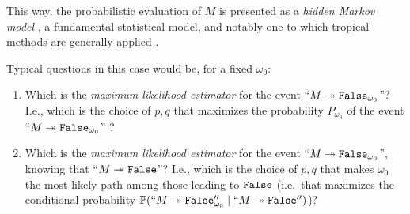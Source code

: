 This way, the probabilistic evaluation of $M$ is presented as a \emph{hidden Markov model} \cite{Baumr966}, a fundamental statistical model, and notably one to which tropical methods are generally applied \cite{Pachter2ll4}.

Typical questions in this case would be, for a fixed $\omega_0$:
%
\begin{enumerate}
 \item Which is the \emph{maximum likelihood estimator} for the event ``$M\twoheadrightarrow \mathtt{False}_{\omega_0}$''?
 I.e., which is the choice of $p,q$ that maximizes the probability $P_{\omega_0}$ of the event ``$M\twoheadrightarrow \mathtt{False}_{\omega_0}$''  ?
 \item Which is the \emph{maximum likelihood estimator} for the event ``$M\twoheadrightarrow \mathtt{False}_{\omega_0}$'', knowing that ``$M\twoheadrightarrow \mathtt{False}$''?
I.e., which is the choice of $p,q$ that makes $\omega_0$ the most likely path among those leading to $\mathtt{False}$ (i.e.\ that maximizes the conditional probability $\mathbb{P}(``M\twoheadrightarrow \mathtt{False}_{\omega_0}'' \mid ``M\twoheadrightarrow \mathtt{False}'')$)?
\end{enumerate}

